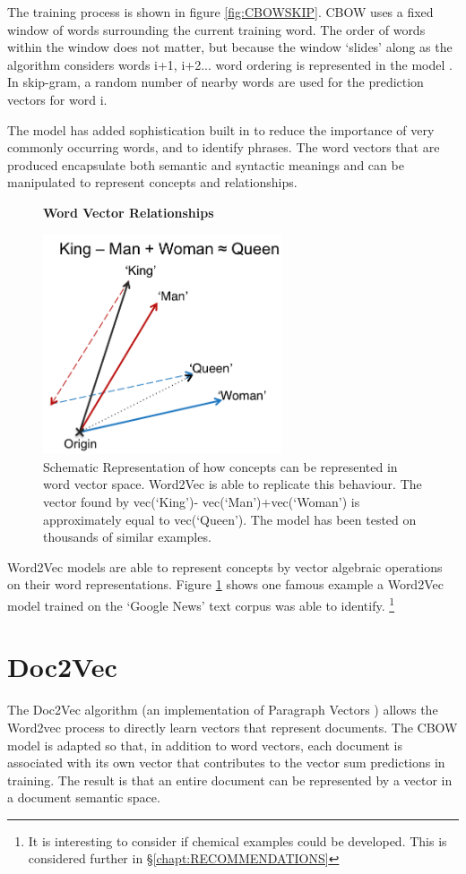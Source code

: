 The training process is shown in figure \ref{fig:CBOWSKIP}. CBOW uses a fixed window of words surrounding the current training word. The order of words within the window does not matter, but because the window `slides' along as the algorithm considers words i+1, i+2... word ordering is represented in the model . In skip-gram, a random number of nearby words are used for the prediction vectors for word i. 

The model has added sophistication built in to reduce the importance of very commonly occurring words, and to identify phrases. The word vectors that are produced encapsulate both semantic and syntactic meanings and can be manipulated to represent concepts and relationships.
\begin{figure}[H]
    \centering
    \textbf{Word Vector Relationships}\par\medskip
    \includegraphics[height=6.5cm]{Natural_Language_Processing/KINGQUEEN.png}
    \caption[Word Vector Relationships]{Schematic Representation of how concepts can be represented in word vector space. Word2Vec is able to replicate this behaviour. The vector found by vec(‘King’)- vec(‘Man’)+vec(‘Woman’) is approximately equal to vec(‘Queen’). The model has been tested on thousands of similar examples\cite{word2vec2}\cite{word2veckingqueen}.}
     \label{fig:KINGQUEEN}
\end{figure}
Word2Vec models are able to represent concepts by vector algebraic operations on their word representations. Figure \ref{fig:KINGQUEEN} shows one famous example a Word2Vec model trained on the `Google News' text corpus was able to identify. \footnote{It is interesting to consider if chemical examples could be developed. This is considered further in \S\ref{chapt:RECOMMENDATIONS}}

\section{Doc2Vec}
The Doc2Vec algorithm \cite{gensim}(an implementation of Paragraph Vectors \cite{doc2vec}) allows the Word2vec process to directly learn vectors that represent documents. The CBOW model is adapted so that, in addition to word vectors, each document is associated with its own vector that contributes to the vector sum predictions in training. The result is that an entire document can be represented by a vector in a document semantic space.

